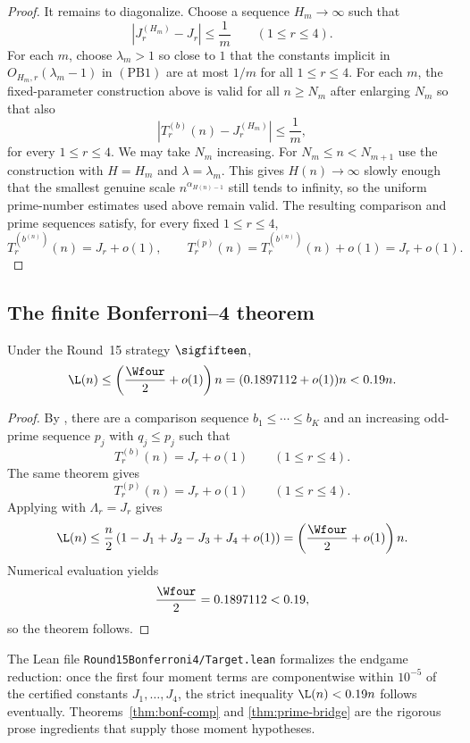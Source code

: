 \begin{proof}
It remains to diagonalize.  Choose a sequence $H_m\to\infty$ such that
\[
  |J_r^{(H_m)}-J_r|\le\frac1m
  \qquad (1\le r\le4).
\]
For each $m$, choose $\lambda_m>1$ so close to $1$ that the constants implicit in
$O_{H_m,r}(\lambda_m-1)$ in \((\mathrm{PB1})\) are at most $1/m$ for
all $1\le r\le4$.  For each $m$, the fixed-parameter construction above is
valid for all $n\ge N_m$ after enlarging $N_m$ so that also
\[
  |T_r^{(b)}(n)-J_r^{(H_m)}|\le \frac1m,
\]
for every $1\le r\le4$.  We may take $N_m$ increasing.  For
$N_m\le n<N_{m+1}$ use the construction with $H=H_m$ and
$\lambda=\lambda_m$.  This gives $H(n)\to\infty$ slowly enough that the
smallest genuine scale $n^{\alpha_{H(n)-1}}$ still tends to infinity, so the
uniform prime-number estimates used above remain valid.  The resulting
comparison and prime sequences satisfy, for every fixed $1\le r\le4$,
\[
  T_r^{(b^{(n)})}(n)=J_r+o(1),
  \qquad
  T_r^{(p)}(n)=T_r^{(b^{(n)})}(n)+o(1)=J_r+o(1).
\]
\end{proof}

\subsection{The finite Bonferroni--4 theorem}

\begin{theorem}\label{thm:main-upper}
Under the Round~15 strategy $\sigfifteen$,
\[
  \L(n) \le \left(\frac{\Wfour}{2}+o(1)\right)n
  = (0.1897112+o(1))n < 0.19n.
\]
\end{theorem}

\begin{proof}
By , there are a comparison sequence
$b_1\le\cdots\le b_K$ and an increasing odd-prime sequence $p_j$ with
$q_j\le p_j$ such that
\[
  T_r^{(b)}(n)=J_r+o(1)
  \qquad (1\le r\le 4).
\]
The same theorem gives
\[
  T_r^{(p)}(n)=J_r+o(1)
  \qquad (1\le r\le 4).
\]
Applying  with $\Lambda_r=J_r$ gives
\[
  \L(n)
  \le
  \frac n2\left(1-J_1+J_2-J_3+J_4+o(1)\right)
  =
  \left(\frac{\Wfour}{2}+o(1)\right)n.
\]
Numerical evaluation yields
\[
  \frac{\Wfour}{2}=0.1897112<0.19,
\]
so the theorem follows.
\end{proof}

\begin{remark}
The Lean file \texttt{Round15Bonferroni4/Target.lean} formalizes the endgame
reduction: once the first four moment terms are componentwise within
$10^{-5}$ of the certified constants $J_1,\dots,J_4$, the strict inequality
$\L(n)<0.19n$ follows eventually.  Theorems~\ref{thm:bonf-comp} and
\ref{thm:prime-bridge} are the rigorous prose ingredients that supply those
moment hypotheses.
\end{remark}
